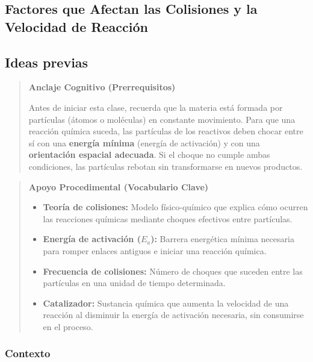 \documentclass[
  spanish,
  letterpaper,
  12pt,
  oneside,
  open=any,
  DIV=15]{scrbook}
\providecommand{\tightlist}{%
  \setlength{\itemsep}{0pt}\setlength{\parskip}{0pt}}
\newcommand{\setcolorsection}[2]{%
  \definecolor{currentsectionbg}{HTML}{#1}%
  \definecolor{currentsectionborder}{HTML}{#2}%
}
\begin{document}
\begin{tcolorbox}
\chapter{Factores que Afectan las Colisiones y la Velocidad de
Reacción}\label{factores-que-afectan-las-colisiones-y-la-velocidad-de-reacciuxf3n}

\setcolorsection{f9ebaf}{e8d68a}

\section{Ideas previas}\label{ideas-previas-7}

\begin{quote}
\textbf{Anclaje Cognitivo (Prerrequisitos)}

Antes de iniciar esta clase, recuerda que la materia está formada por
partículas (átomos o moléculas) en constante movimiento. Para que una
reacción química suceda, las partículas de los reactivos deben chocar
entre sí con una \textbf{energía mínima} (energía de activación) y con
una \textbf{orientación espacial adecuada}. Si el choque no cumple ambas
condiciones, las partículas rebotan sin transformarse en nuevos
productos.
\end{quote}

\begin{quote}
\textbf{Apoyo Procedimental (Vocabulario Clave)}

\begin{itemize}
\tightlist
\item
  \textbf{Teoría de colisiones:} Modelo físico-químico que explica cómo
  ocurren las reacciones químicas mediante choques efectivos entre
  partículas.
\item
  \textbf{Energía de activación (\(E_a\)):} Barrera energética mínima
  necesaria para romper enlaces antiguos e iniciar una reacción química.
\item
  \textbf{Frecuencia de colisiones:} Número de choques que suceden entre
  las partículas en una unidad de tiempo determinada.
\item
  \textbf{Catalizador:} Sustancia química que aumenta la velocidad de
  una reacción al disminuir la energía de activación necesaria, sin
  consumirse en el proceso.
\end{itemize}
\end{quote}

\subsection{Contexto}\label{contexto-7}


\end{tcolorbox}
\end{document}
